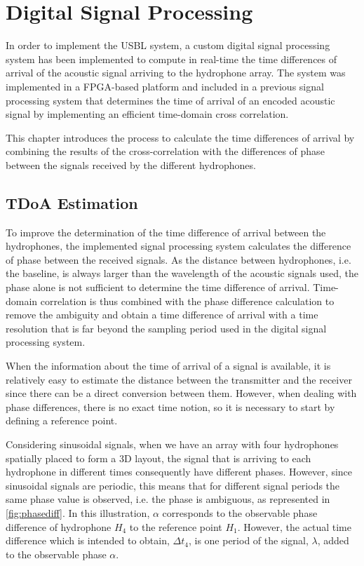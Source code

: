 \chapter{Digital Signal Processing } \label{chap:hdl}

In order to implement the USBL system, a custom digital signal processing system has been implemented to compute in real-time the time differences of arrival of the acoustic signal arriving to the hydrophone array. The system was implemented in a FPGA-based platform and included in a previous signal processing system that determines the time of arrival of an encoded acoustic signal by implementing an efficient time-domain cross correlation. 

This chapter introduces the process to calculate the time differences of arrival by combining the results of the cross-correlation with the differences of phase between the signals received by the different hydrophones.

\section{TDoA Estimation}

To improve the determination of the time difference of arrival between the hydrophones, the implemented signal processing system calculates the difference of phase between the received signals. As the distance between hydrophones, i.e. the baseline, is always larger than the wavelength of the acoustic signals used, the phase alone is not sufficient to determine the time difference of arrival. Time-domain correlation is thus combined with the phase difference calculation to remove the ambiguity and obtain a time difference of arrival with a time resolution that is far beyond the sampling period used in the digital signal processing system.

When the information about the time of arrival of a signal is available, it is relatively easy to estimate the distance between the transmitter and the receiver since there can be a direct conversion between them. However, when dealing with phase differences, there is no exact time notion, so it is necessary to start by defining a reference point. 

Considering sinusoidal signals, when we have an array with four hydrophones spatially placed to form a 3D layout, the signal that is arriving to each  hydrophone in different times consequently have different phases. However, since sinusoidal signals are periodic, this means that for different signal periods the same phase value is observed, i.e. the phase is ambiguous, as represented in \ref{fig:phasediff}. In this illustration, $\alpha$ corresponds to the observable phase difference of hydrophone $H_4$ to the reference point $H_1$. However, the actual time difference which is intended to obtain, $\Delta t_4$, is one period of the signal, $\lambda$, added to the observable phase $\alpha$.

